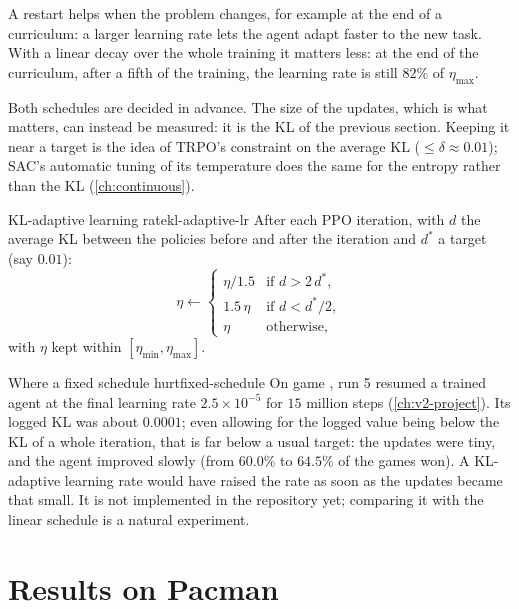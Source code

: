A restart helps when the problem changes, for example at the end of a
curriculum: a larger learning rate lets the agent adapt faster to the new
task. With a linear decay over the whole training it matters less: at the
end of the curriculum, after a fifth of the training, the learning rate is
still $82\%$ of $\eta_{\max}$.

Both schedules are decided in advance. The size of the updates, which is
what matters, can instead be measured: it is the KL of the previous
section. Keeping it near a target is the idea of TRPO's constraint on the
average KL ($\leq \delta \approx 0.01$); SAC's automatic tuning of its
temperature does the same for the entropy rather than the KL
(\cref{ch:continuous}).

\begin{definition}{KL-adaptive learning rate}{kl-adaptive-lr}
  After each PPO iteration, with $d$ the average KL between the policies
  before and after the iteration and $d^\ast$ a target (say $0.01$):
  \begin{equation}
    \eta \leftarrow
    \begin{cases}
      \eta / 1.5 & \text{if } d > 2\, d^\ast, \\
      1.5\, \eta & \text{if } d < d^\ast / 2, \\
      \eta & \text{otherwise},
    \end{cases}
  \end{equation}
  with $\eta$ kept within $[\eta_{\min}, \eta_{\max}]$.
\end{definition}

\begin{pacman}{Where a fixed schedule hurt}{fixed-schedule}
  On game , run 5 resumed a trained agent at the final learning
  rate $2.5 \times 10^{-5}$ for $15$ million steps (\cref{ch:v2-project}).
  Its logged KL was about $0.0001$; even allowing for the logged value
  being below the KL of a whole iteration, that is far below a usual
  target: the updates were tiny, and the agent improved slowly (from $60.0\%$ to
  $64.5\%$ of the games won). A KL-adaptive learning rate would have raised
  the rate as soon as the updates became that small. It is not implemented
  in the repository yet; comparing it with the linear schedule is a natural
  experiment.
\end{pacman}

\section{Results on Pacman}

